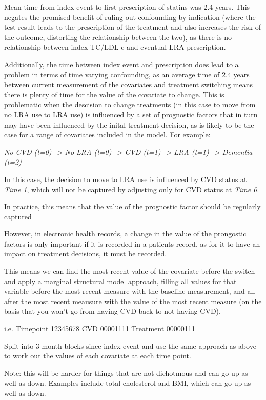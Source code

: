 \documentclass[a4paper, nobind]{templates/ociamthesis}
\begin{document}
Mean time from index event to first prescription of statins was 2.4 years. This negates the promised benefit of ruling out confounding by indication (where the test result leads to the prescription of the treatment and also increases the risk of the outcome, distorting the relationship between the two), as there is no relationship between index TC/LDL-c and eventual LRA prescription.

Additionally, the time between index event and prescription does lead to a problem in terms of time varying confounding, as an average time of 2.4 years between current measurement of the covariates and treatment switching means there is plenty of time for the value of the covariate to change. This is problematic when the descision to change treatments (in this case to move from no LRA use to LRA use) is influenced by a set of prognostic factors that in turn may have been influenced by the inital treatment decision, as is likely to be the case for a range of covariates included in the model. For example:

\emph{No CVD (t=0) -\textgreater{} No LRA (t=0) -\textgreater{} CVD (t=1) -\textgreater{} LRA (t=1) -\textgreater{} Dementia (t=2)}

In this case, the decision to move to LRA use is influenced by CVD status at \emph{Time 1}, which will not be captured by adjusting only for CVD status at \emph{Time 0}.

In practice, this means that the value of the prognostic factor should be regularly captured

However, in electronic health records, a change in the value of the prongostic factors is only important if it is recorded in a patients record, as for it to have an impact on treatment decisions, it must be recorded.

This means we can find the most recent value of the covariate before the switch and apply a marginal structural model approach, filling all values for that variable before the most recent measure with the baseline measurement, and all after the most recent meausure with the value of the most recent measure (on the basis that you won't go from having CVD back to not having CVD).

i.e.
Timepoint 12345678
CVD 00001111
Treatment 00000111

Split into 3 month blocks since index event and use the same approach as above to work out the values of each covariate at each time point.

Note: this will be harder for things that are not dichotmous and can go up as well as down. Examples include total cholesterol and BMI, which can go up as well as down.
\end{document}
